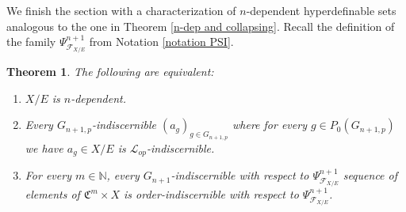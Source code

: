 \documentclass{amsart}
\newtheorem{teor}{Theorem}[section]
\newtheorem{external claim}[teor]{Claim}
\newcommand{\C}{{\mathfrak C}}
\newcommand{\mL}{\mathcal{L}}
\begin{document}
We finish the section with a characterization of $n$-dependent hyperdefinable sets analogous to the one in Theorem \ref{n-dep and collapsing}. Recall the definition of the family $\Psi^{n+1}_{\mathcal{F}_{X/E}}$ from Notation \ref{notation PSI}.

\begin{teor}
The following are equivalent:
    \begin{enumerate}
        \item $X/E$ is $n$-dependent.
        \item Every $G_{n+1,p}$-indiscernible $(a_g)_{g\in G_{n+1,p}}$ where for every $g\in P_0(G_{n+1,p})$ we have $a_g\in X/E$ is $\mL_{op}$-indiscernible.
        \item For every $m\in \mathbb{N}$, every $G_{n+1}$-indiscernible with respect to $\Psi^{n+1}_{\mathcal{F}_{X/E}}$ sequence of elements of $\C^m\times X$  is order-indiscernible with respect to $ \Psi^{n+1}_{\mathcal{F}_{X/E}}$.
    \end{enumerate}
\end{teor}
\end{document}
